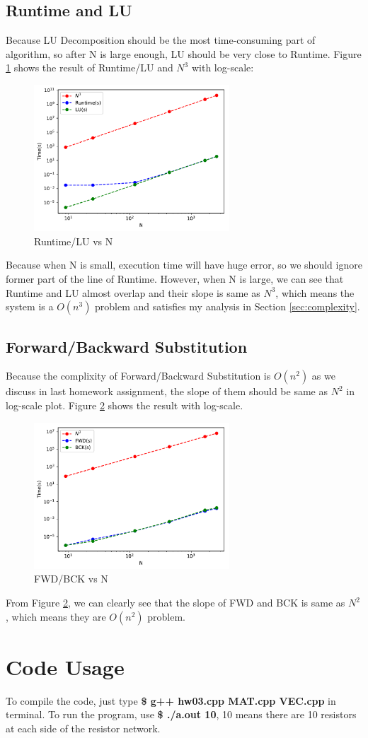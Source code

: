 \documentclass{article}
\begin{document}
\subsection{Runtime and LU}
Because LU Decomposition should be the most time-consuming part of algorithm, so after N is large enough, LU should be very close to
Runtime. Figure \ref{fig:runtime_lu} shows the result of Runtime/LU and $N^3$ with log-scale:
\begin{figure}[H]
    \centering
    \includegraphics[width=0.65\textwidth]{src/runtime_lu.pdf}
    \caption{Runtime/LU vs N}
    \label{fig:runtime_lu}
\end{figure}
Because when N is small, execution time will have huge error, so we should ignore former part of the line of Runtime. However, when
N is large, we can see that Runtime and LU almost overlap and their slope is same as $N^3$, which means the system is a 
{\boldmath$O(n^3)$} problem and satisfies my analysis in Section \ref{sec:complexity}.

\subsection{Forward/Backward Substitution}
Because the complixity of Forward/Backward Substitution is {\boldmath$O(n^2)$} as we discuss in last homework assignment, the
slope of them should be same as $N^2$ in log-scale plot. Figure \ref{fig:fwd_bck} shows the result with log-scale.
\begin{figure}[H]
    \centering
    \includegraphics[width=0.65\textwidth]{src/fwd_bck.pdf}
    \caption{FWD/BCK vs N}
    \label{fig:fwd_bck}
\end{figure}
From Figure \ref{fig:fwd_bck}, we can clearly see that the slope of FWD and BCK is same as $N^2$, which means they are
{\boldmath$O(n^2)$} problem.

\section{Code Usage}
To compile the code, just type \textbf{\$ g++ hw03.cpp MAT.cpp VEC.cpp} in terminal. \newline
To run the program, use \textbf{\$ ./a.out 10}, 10 means there are 10 resistors at each side of the resistor network.
\end{document}
